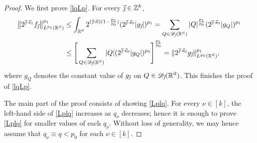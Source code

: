 \documentclass[11pt, reqno]{amsart}
\theoremstyle{definition}
\theoremstyle{remark}
\numberwithin{equation}{section}
\newcommand{\R}{\mathbb R}
\newcommand{\vj}{\vec{\textit{\j}}}
\newcommand{\vn}{\vec n}
\begin{document}
\begin{proof}
We first prove \eqref{lqLp}.
For every $\vj \in\mathbb Z^k$,
\begin{align*}
\big\|2^{\vj\cdot \vec s_1} f_{\vj}\big\|_{L^{p_1}(\R^{\vn})}^{p_1}
&\leq \int_{\mathbb R^{\vec n}}
2^{(\vj\cdot \vec n)(1-\frac{p_1}{p_0})}
(2^{\vj\cdot \vec s_0}|g_{\vj}|)^{p_1}
= \sum_{Q\in \mathscr D_{\vj}(\mathbb R^{\vec n})}
|Q|^{\frac{p_1}{p_0}} (2^{\vj\cdot \vec s_0} |g_Q|)^{p_1} \\
&\leq \Bigg[\sum_{Q\in \mathscr D_{\vj}(\mathbb R^{\vec n})}
|Q| (2^{\vj\cdot \vec s_0}|g_Q|)^{p_0}\Bigg]^{\frac{p_1}{p_0}}
= \|2^{\vj\cdot \vec s_0} g_{\vj}\|_{L^{p_0}(\R^{\vn})}^{p_1},
\end{align*}
where $g_Q$ denotes the constant value of $g_{\vj}$
on $Q\in\mathscr D_{\vj}(\R^{\vn})$.
This finishes the proof of \eqref{lqLp}.

The main part of the proof consists of showing \eqref{Lplq}.
For every $\nu\in[k]$, the left-hand side of \eqref{Lplq} increases as $q_\nu$ decreases; hence it is enough to prove \eqref{Lplq} for smaller values of each $q_\nu$. Without loss of generality, we may hence assume that $q_\nu\equiv q<p_0$ for each $\nu\in[k]$.


\end{proof}
\end{document}
